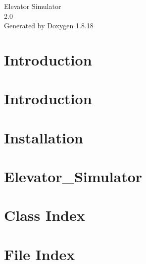 \let\mypdfximage\pdfximage\def\pdfximage{\immediate\mypdfximage}\documentclass[twoside]{book}
\newcommand{\+}{\discretionary{\mbox{\scriptsize$\hookleftarrow$}}{}{}}
\newcommand{\clearemptydoublepage}{%
  \newpage{\pagestyle{empty}\cleardoublepage}%
}
\begin{document}
\hypersetup{pageanchor=false,
             bookmarksnumbered=true,
             pdfencoding=unicode
            }
\begin{titlepage}
\vspace*{7cm}
\begin{center}%
{\Large Elevator Simulator \\[1ex]\large 2.\+0 }\\
\vspace*{1cm}
{\large Generated by Doxygen 1.8.18}\\
\end{center}
\end{titlepage}
\clearemptydoublepage
{}
\tableofcontents
\clearemptydoublepage
{}
\hypersetup{pageanchor=true}

\chapter{Introduction}
\label{md__developer__manual}

\chapter{Introduction}
\label{md__user__manual}

\chapter{Installation}
\label{md__c_1__users__work_git_repo_elevator_simulator__i_n_s_t_a_l_l}

\chapter{Elevator\+\_\+\+Simulator}
\label{md__c_1__users__work_git_repo_elevator_simulator__r_e_a_d_m_e}

\chapter{Class Index}

\chapter{File Index}

\end{document}

